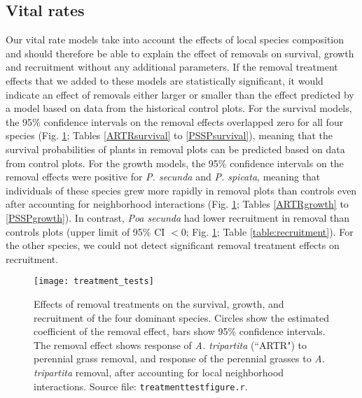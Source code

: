 \documentclass[11pt]{article}
\begin{document}
\begin{doublespacing}
\subsection*{Vital rates}

Our vital rate models take into account the effects of local species composition and should therefore be able to explain the effect of removals on survival, growth and recruitment without any additional parameters. If the removal treatment effects that we added to these models are statistically significant, it would indicate an effect of removals either larger or smaller than the effect predicted by a model based on data from the historical control plots. For the survival models, the 95\% confidence intervals on the removal effects overlapped zero for all four species (Fig. \ref{fig:VitalRateTest}; Tables \ref{ARTRsurvival} to \ref{PSSPsurvival}), meaning that the survival probabilities of plants in removal plots can be predicted based on data from control plots. For the growth models, the 95\% confidence intervals on the removal effects were positive for \textit{P. secunda}  and \textit{P. spicata}, meaning that individuals of these species grew more rapidly in removal plots than controls even after accounting for neighborhood interactions (Fig. \ref{fig:VitalRateTest}; Tables \ref{ARTRgrowth} to \ref{PSSPgrowth}). In contrast, \textit{Poa secunda} had lower recruitment in removal than controls plots (upper limit of 95\% CI $<0$; Fig. \ref{fig:VitalRateTest}; Table \ref{table:recruitment}). For the other species, we could not detect significant removal treatment effects on recruitment.

 \begin{figure}[tbp]
 \centering
 \texttt{[image: treatment\_tests]}
 \caption{Effects of removal treatments on the survival, growth, and recruitment of the four dominant species. Circles show the estimated coefficient of the removal effect, bars show 95\% confidence intervals. The removal effect shows response of \textit{A. tripartita} (``ARTR") to perennial grass removal, and response of the perennial grasses to \textit{A. tripartita} removal, after accounting for local neighborhood interactions. 
 Source file: \texttt{treatment\textunderscore test\textunderscore figure.r}.}
 \label{fig:VitalRateTest}
 \end{figure}


\end{doublespacing}
\end{document}
